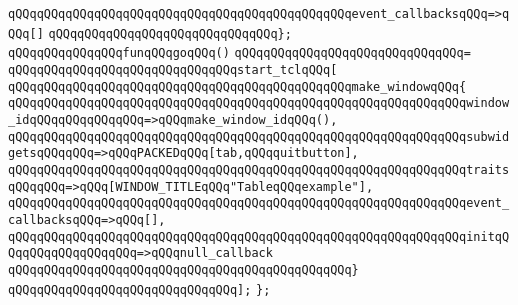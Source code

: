 \verb|qQQqqQQqqQQqqQQqqQQqqQQqqQQqqQQqqQQqqQQqqQQqqQQqevent_callbacksqQQq=>qQQq[]|\newline
\verb|qQQqqQQqqQQqqQQqqQQqqQQqqQQqqQQq};|\newline
\newline
\verb|qQQqqQQqqQQqqQQqfunqQQqgoqQQq()|\newline
\verb|qQQqqQQqqQQqqQQqqQQqqQQqqQQqqQQq=|\newline
\verb|qQQqqQQqqQQqqQQqqQQqqQQqqQQqqQQqstart_tclqQQq[|\newline
\verb|qQQqqQQqqQQqqQQqqQQqqQQqqQQqqQQqqQQqqQQqqQQqqQQqmake_windowqQQq{|\newline
\verb|qQQqqQQqqQQqqQQqqQQqqQQqqQQqqQQqqQQqqQQqqQQqqQQqqQQqqQQqqQQqqQQqwindow_idqQQqqQQqqQQqqQQq=>qQQqmake_window_idqQQq(),|\newline
\verb|qQQqqQQqqQQqqQQqqQQqqQQqqQQqqQQqqQQqqQQqqQQqqQQqqQQqqQQqqQQqqQQqsubwidgetsqQQqqQQq=>qQQqPACKEDqQQq[tab,qQQqquitbutton],|\newline
\verb|qQQqqQQqqQQqqQQqqQQqqQQqqQQqqQQqqQQqqQQqqQQqqQQqqQQqqQQqqQQqqQQqtraitsqQQqqQQq=>qQQq[WINDOW_TITLEqQQq"TableqQQqexample"],|\newline
\verb|qQQqqQQqqQQqqQQqqQQqqQQqqQQqqQQqqQQqqQQqqQQqqQQqqQQqqQQqqQQqqQQqevent_callbacksqQQq=>qQQq[],|\newline
\verb|qQQqqQQqqQQqqQQqqQQqqQQqqQQqqQQqqQQqqQQqqQQqqQQqqQQqqQQqqQQqqQQqinitqQQqqQQqqQQqqQQqqQQq=>qQQqnull_callback|\newline
\verb|qQQqqQQqqQQqqQQqqQQqqQQqqQQqqQQqqQQqqQQqqQQqqQQq}|\newline
\verb|qQQqqQQqqQQqqQQqqQQqqQQqqQQqqQQq];|\newline
\verb|};|\newline

